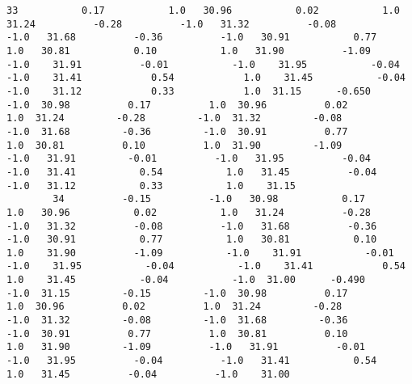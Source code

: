 \documentclass[11pt]{article}
\begin{document}
\begin{Verbatim}[commandchars=\\\{\}]
        33           0.17           1.0   30.96           0.02           1.0   31.24          -0.28          -1.0   31.32          -0.08          -1.0   31.68          -0.36          -1.0   30.91           0.77           1.0   30.81           0.10           1.0   31.90          -1.09          -1.0    31.91          -0.01           -1.0    31.95           -0.04           -1.0    31.41            0.54            1.0    31.45           -0.04           -1.0    31.12            0.33            1.0  31.15      -0.650         -1.0  30.98          0.17          1.0  30.96          0.02          1.0  31.24         -0.28         -1.0  31.32         -0.08         -1.0  31.68         -0.36         -1.0  30.91          0.77          1.0  30.81          0.10          1.0  31.90         -1.09         -1.0   31.91         -0.01          -1.0   31.95          -0.04          -1.0   31.41           0.54           1.0   31.45          -0.04          -1.0   31.12           0.33           1.0    31.15   
        34          -0.15          -1.0   30.98           0.17           1.0   30.96           0.02           1.0   31.24          -0.28          -1.0   31.32          -0.08          -1.0   31.68          -0.36          -1.0   30.91           0.77           1.0   30.81           0.10           1.0    31.90          -1.09           -1.0    31.91           -0.01           -1.0    31.95           -0.04           -1.0    31.41            0.54            1.0    31.45           -0.04           -1.0  31.00      -0.490         -1.0  31.15         -0.15         -1.0  30.98          0.17          1.0  30.96          0.02          1.0  31.24         -0.28         -1.0  31.32         -0.08         -1.0  31.68         -0.36         -1.0  30.91          0.77          1.0  30.81          0.10          1.0   31.90         -1.09          -1.0   31.91          -0.01          -1.0   31.95          -0.04          -1.0   31.41           0.54           1.0   31.45          -0.04          -1.0    31.00   
        

\end{Verbatim}
\end{document}
